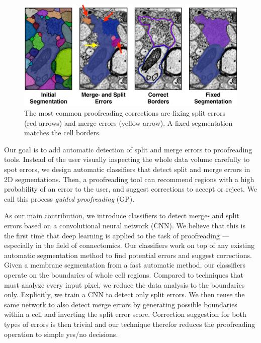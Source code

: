 \begin{figure}[t]
\begin{center}
  \includegraphics[width=\linewidth]{gfx/merge_and_split_errors.png}
\end{center}
\vspace{-4mm}
   \caption{The most common proofreading corrections are fixing split errors (red arrows) and merge errors (yellow arrow). A fixed segmentation matches the cell borders.}
\label{fig:merge_and_slit_errors}
\end{figure}

Our goal is to add automatic detection of split and merge errors to proofreading tools. Instead of the user visually inspecting the whole data volume carefully to spot errors, we design automatic classifiers that detect split and merge errors in 2D segmentations. Then, a proofreading tool can recommend regions with a high probability of an error to the user, and suggest corrections to accept or reject. We call this process \textit{guided proofreading} (GP).

As our main contribution, we introduce classifiers to detect merge- and split errors based on a convolutional neural network (CNN). We believe that this is the first time that deep learning is applied to the task of proofreading --- especially in the field of connectomics. Our classifiers work on top of any existing automatic segmentation method to find potential errors and suggest corrections. Given a membrane segmentation from a fast automatic method, our classifiers operate on the boundaries of whole cell regions. Compared to techniques that must analyze every input pixel, we reduce the data analysis to the boundaries only. Explicitly, we train a CNN to detect only split errors. We then reuse the same network to also detect merge errors by generating possible boundaries within a cell and inverting the split error score. Correction suggestion for both types of errors is then trivial and our technique therefor reduces the proofreading operation to simple yes/no decisions. 

